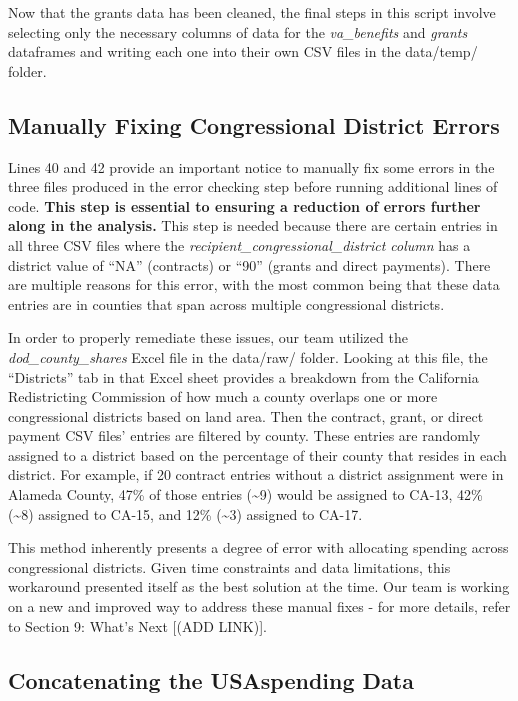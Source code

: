 \documentclass[
]{book}
\begin{document}
Now that the grants data has been cleaned, the final steps in this script involve selecting only the necessary columns of data for the \emph{va\_benefits} and \emph{grants} dataframes and writing each one into their own CSV files in the data/temp/ folder.

\hypertarget{fix-errors}{%
\subsection{Manually Fixing Congressional District Errors}\label{fix-errors}}

Lines 40 and 42 provide an important notice to manually fix some errors in the three files produced in the error checking step before running additional lines of code. \textbf{This step is essential to ensuring a reduction of errors further along in the analysis.} This step is needed because there are certain entries in all three CSV files where the \emph{recipient\_congressional\_district column} has a district value of ``NA'' (contracts) or ``90'' (grants and direct payments). There are multiple reasons for this error, with the most common being that these data entries are in counties that span across multiple congressional districts.

In order to properly remediate these issues, our team utilized the \emph{dod\_county\_shares} Excel file in the data/raw/ folder. Looking at this file, the ``Districts'' tab in that Excel sheet provides a breakdown from the California Redistricting Commission of how much a county overlaps one or more congressional districts based on land area. Then the contract, grant, or direct payment CSV files' entries are filtered by county. These entries are randomly assigned to a district based on the percentage of their county that resides in each district. For example, if 20 contract entries without a district assignment were in Alameda County, 47\% of those entries (\textasciitilde9) would be assigned to CA-13, 42\% (\textasciitilde8) assigned to CA-15, and 12\% (\textasciitilde3) assigned to CA-17.

This method inherently presents a degree of error with allocating spending across congressional districts. Given time constraints and data limitations, this workaround presented itself as the best solution at the time. Our team is working on a new and improved way to address these manual fixes - for more details, refer to Section 9: What's Next {[}(ADD LINK){]}.

\hypertarget{concat-usa}{%
\subsection{Concatenating the USAspending Data}\label{concat-usa}}
\end{document}

